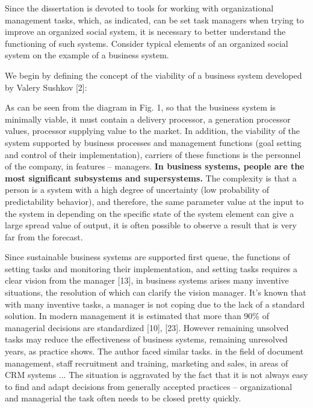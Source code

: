 Since the dissertation is devoted to tools for working with organizational
management tasks, which, as indicated, can be set task managers when trying to
improve an organized social system, it is necessary to better understand the
functioning of such systems. Consider typical elements of an organized social
system on the example of a business system.

We begin by defining the concept of the viability of a business system
developed by Valery Sushkov [2]:


As can be seen from the diagram in Fig. 1, so that the business system is
minimally viable, it must contain a delivery processor, a generation processor
values, processor supplying value to the market. In addition, the viability of
the system supported by business processes and management functions (goal
setting and control of their implementation), carriers of these functions is
the personnel of the company, in features -- managers. \textbf{In business
  systems, people are the most significant subsystems and supersystems.} The
complexity is that a person is a system with a high degree of uncertainty (low
probability of predictability behavior), and therefore, the same parameter
value at the input to the system in depending on the specific state of the
system element can give a large spread value of output, it is often possible
to observe a result that is very far from the forecast.

Since sustainable business systems are supported first queue, the functions of
setting tasks and monitoring their implementation, and setting tasks requires
a clear vision from the manager [13], in business systems arises many
inventive situations, the resolution of which can clarify the vision manager.
It’s known that with many inventive tasks, a manager is not coping due to the
lack of a standard solution. In modern management it is estimated that more
than 90\% of managerial decisions are standardized [10], [23]. However
remaining unsolved tasks may reduce the effectiveness of business systems,
remaining unresolved years, as practice shows. The author faced similar tasks.
in the field of document management, staff recruitment and training, marketing
and sales, in areas of CRM systems ... The situation is aggravated by the fact
that it is not always easy to find and adapt decisions from generally accepted
practices -- organizational and managerial the task often needs to be closed
pretty quickly.

